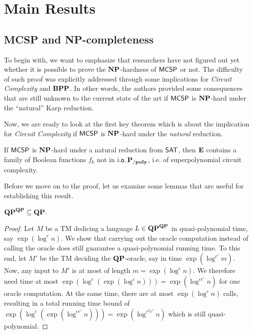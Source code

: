 \documentclass[11pt]{article}
\begin{document}
\section{Main Results}

\subsection{MCSP and NP-completeness}
\label{subsect:MCSP-NP}

To begin with, we want to emphasize that researchers have not figured out yet whether it is possible to prove the $\mathbf{NP}$-hardness of $\mathsf{MCSP}$ or not. The difficulty of such proof was explicitly addressed through some implications for \textit{Circuit Complexity} and $\mathbf{BPP}$. In other words, the authors provided some consequences that are still unknown to the current state of the art if $\mathsf{MCSP}$ is $\mathbf{NP}$-hard under the ``natural'' Karp reduction. 

Now, we are ready to look at the first key theorem which is about the implication for \textit{Circuit Complexity} if $\mathsf{MCSP}$ is $\mathbf{NP}$-hard under the \textit{natural} reduction.

\begin{theorem}[\cite{10.1145/335305.335314}]
  \label{thm:15-1}
  If $\mathsf{MCSP}$ is $\mathbf{NP}$-hard under a natural reduction from
  $\mathsf{SAT}$, then $\mathbf{E}$ contains a family of Boolean functions
  $f_k$ not in $\mathsf{i.o.}\, \mathbf{P_{/poly}}$, i.e. of superpolynomial circuit complexity.
\end{theorem}

Before we move on to the proof, let us examine some lemmas that are useful
for establishing this result.

\begin{lemma}
	\label{lem:qp-collapse}
	$\mathbf{QP}^{\mathbf{QP}} \subseteq \mathbf{QP}$.
\end{lemma}

\begin{proof}
  Let $M$ be a TM dedicing a language $L \in \mathbf{QP}^{\mathbf{QP}}$ in
  quasi-polynomial time, say $\exp(\log^c n)$.
  We show that carrying out the oracle computation instead of calling the
  oracle does still guarantee a quasi-polynomial running time. To this end,
  let $M'$ be the TM deciding the $\mathbf{QP}$-oracle, say in time
  $\exp(\log^{c'} m)$.
  Now, any input to $M'$ is at most of length $m = \exp(\log^c n)$. We
  therefore need time at most
  $\exp(\log^c (\exp(\log^c n))) = \exp(\log^{cc'} n)$
  for one oracle computation. At the same time, there are at most
  $\exp(\log^c n)$ calls, resulting in a total running time bound of
  $\exp(\log^c (\exp(\log^{cc'} n))) = \exp(\log^{c^2 c'} n)$
  which is still quasi-polynomial.
\end{proof}
\end{document}
